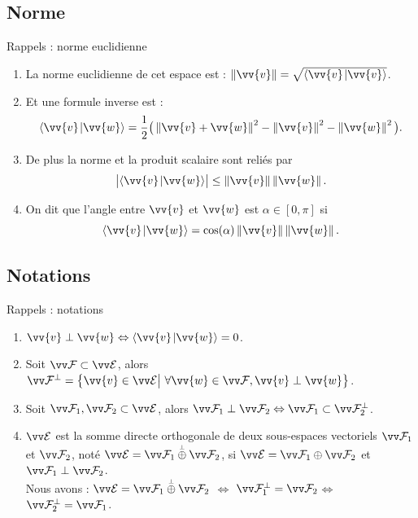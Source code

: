 \documentclass[bigger]{m53beamer}
\begin{document}
\subsection{Norme}
\begin{frame}{Rappels : norme euclidienne}
  \begin{enumerate}[<+(1)->]
    \item La \alert{norme euclidienne} de cet espace est : $\norm{\vv{v}} = \sqrt{\scalprod{\vv{v}}{\vv{v}}}$.
    \item Et une formule inverse  est :
      \[
        \scalprod{\vv{v}}{\vv{w}} = \frac12\big( \norm{\vv{v}+\vv{w}}^{2} - \norm{\vv{v}}^{2} - \norm{\vv{w}}^{2}\big).
      \]
    \item De plus la norme et la produit scalaire sont reliés par 
      \[
        \big|\scalprod{\vv{v}}{\vv{w}}\big| \leq \norm{\vv{v}}\norm{\vv{w}}.
      \]
    \item On dit que \alert{l'angle} entre $\vv{v}$ et $\vv{w}$ est $\alpha \in[0,\pi]$ si
      \[
        \scalprod{\vv{v}}{\vv{w}} = \cos(\alpha)\norm{\vv{v}}\norm{\vv{w}}.
      \]
  \end{enumerate}
\end{frame}

\subsection{Notations}
\begin{frame}{Rappels : notations}
  \begin{enumerate}[<+(1)->]
    \item $\vv{v}\perp\vv{w} \Leftrightarrow \scalprod{\vv{v}}{\vv{w}}=0$.
    \item Soit $\ev{F}\subset\ev{E}$, alors $\ev{F}^{\perp}=\big\{\vv{v} \in \ev{E} \big|\ \forall \vv{w} \in \ev{F}, \vv{v}\perp\vv{w} \big\}$.
    \item Soit $\ev{F}_{1},\ev{F}_{2}\subset\ev{E}$, alors $\ev{F}_{1}\perp\ev{F}_{2} \Leftrightarrow \ev{F}_{1}\subset\ev{F}_{2}^{\perp}$.
    \item $\ev{E}$ est la somme directe orthogonale de deux sous-espaces vectoriels $\ev{F}_{1}$ et $\ev{F}_{2}$, noté $\ev{E}=\ev{F}_{1}\poplus\ev{F}_{2}$, \pause si $\ev{E}=\ev{F}_{1}\oplus\ev{F}_{2}$ et $\ev{F}_{1}\perp\ev{F}_{2}$.\pause\\
    Nous avons : $\ev{E}=\ev{F}_{1}\poplus\ev{F}_{2}$ $\Leftrightarrow$ $\ev{F}_{1}^{\perp} = \ev{F}_{2}$\pause $\Leftrightarrow$ $\ev{F}_{2}^{\perp} = \ev{F}_{1}$.
  \end{enumerate}
\end{frame}
\end{document}
